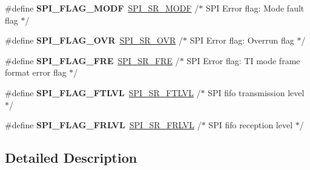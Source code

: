 \begin{DoxyCompactItemize}
\#define {\bfseries S\+P\+I\+\_\+\+F\+L\+A\+G\+\_\+\+M\+O\+DF}~\hyperlink{group___peripheral___registers___bits___definition_gabaa043349833dc7b8138969c64f63adf}{S\+P\+I\+\_\+\+S\+R\+\_\+\+M\+O\+DF}   /$\ast$ S\+PI Error flag\+: Mode fault flag                 $\ast$/
\item 
\mbox{\label{group___s_p_i___flags__definition_gab45264da2296c75495a7437a045513ea}} 
\#define {\bfseries S\+P\+I\+\_\+\+F\+L\+A\+G\+\_\+\+O\+VR}~\hyperlink{group___peripheral___registers___bits___definition_gaa8d902302c5eb81ce4a57029de281232}{S\+P\+I\+\_\+\+S\+R\+\_\+\+O\+VR}    /$\ast$ S\+PI Error flag\+: Overrun flag                    $\ast$/
\item 
\mbox{\label{group___s_p_i___flags__definition_ga27dd114d8adc70f1439c054289f9313a}} 
\#define {\bfseries S\+P\+I\+\_\+\+F\+L\+A\+G\+\_\+\+F\+RE}~\hyperlink{group___peripheral___registers___bits___definition_gace2c7cac9431231663af42e6f5aabce6}{S\+P\+I\+\_\+\+S\+R\+\_\+\+F\+RE}    /$\ast$ S\+PI Error flag\+: TI mode frame format error flag $\ast$/
\item 
\mbox{\label{group___s_p_i___flags__definition_gac8148197385a872c6f996a78928d1c20}} 
\#define {\bfseries S\+P\+I\+\_\+\+F\+L\+A\+G\+\_\+\+F\+T\+L\+VL}~\hyperlink{group___peripheral___registers___bits___definition_ga17880f1e186033ebc6917c008a623371}{S\+P\+I\+\_\+\+S\+R\+\_\+\+F\+T\+L\+VL}  /$\ast$ S\+PI fifo transmission level                     $\ast$/
\item 
\mbox{\label{group___s_p_i___flags__definition_ga4406c904711e73f41bfbc930bfc92d58}} 
\#define {\bfseries S\+P\+I\+\_\+\+F\+L\+A\+G\+\_\+\+F\+R\+L\+VL}~\hyperlink{group___peripheral___registers___bits___definition_ga60df84101c523802832c4d1a2895d665}{S\+P\+I\+\_\+\+S\+R\+\_\+\+F\+R\+L\+VL}  /$\ast$ S\+PI fifo reception level                        $\ast$/
\end{DoxyCompactItemize}


\subsection{Detailed Description}
